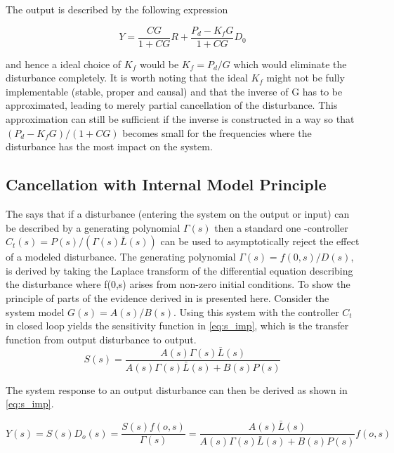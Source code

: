 The output is described by the following expression

\begin{equation}
  \label{eq:ffdist}
  Y = \frac{CG}{1+CG}R + \frac{P_d - K_fG}{1+CG}D_0
\end{equation}

and hence a ideal choice of $K_f$ would be $K_f=P_d/G$ which would eliminate the disturbance completely. It is worth noting that the ideal $K_f$ might not be fully implementable (stable, proper and causal) and that the inverse of G has to be approximated, leading to merely partial cancellation of the disturbance. This approximation can still be sufficient if the inverse is constructed in a way so that $(P_d - K_fG)/(1+CG)$ becomes small for the frequencies where the disturbance has the most impact on the system.

\subsection{Cancellation with Internal Model Principle}\label{subsec:distimp}
The \abbrIMP says that if a disturbance (entering the system on the output or input) can be described by a generating polynomial $\Gamma(s)$ then a standard one \abbrDOF-controller $C_{t}(s) = P(s)/(\Gamma(s)\bar{L}(s))$ can be used to asymptotically reject the effect of a modeled disturbance.  The generating polynomial $\Gamma(s) = f(0,s)/D(s)$, is derived by taking the Laplace transform of the differential equation describing the disturbance where f(0,s) arises from non-zero initial conditions. To show the principle of \abbrIMP parts of the evidence derived in \citep{IMP:Perry} is presented here. Consider the system model $G(s) = A(s)/B(s)$. Using this system with the controller $C_t$ in closed loop yields the sensitivity function in \eqref{eq:s_imp}, which is the transfer function from output disturbance to output.
\begin{equation}
  \label{eq:s_imp}
  S(s) = \frac{A(s)\Gamma(s)\bar{L}(s)}{A(s)\Gamma(s)\bar{L}(s) + B(s)P(s)}
\end{equation}

The system response to an output disturbance can then be derived as shown in \eqref{eq:s_imp}.

\begin{equation}
  \label{eq:y_imp}
  Y(s) = S(s)D_o(s) = \frac{S(s)f(o,s)}{\Gamma(s)} = \frac{A(s)\bar{L}(s)}{A(s)\Gamma(s)\bar{L}(s) + B(s)P(s)}f(o,s)
\end{equation}

